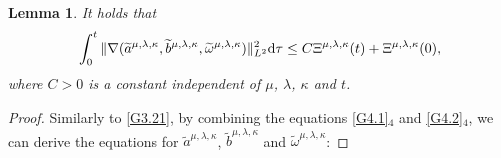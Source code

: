 \documentclass[reqno,11pt]{amsart}
\theoremstyle{plain}
\newtheorem{lem}[thm]{Lemma}
\numberwithin{equation}{section}
\begin{document}
\begin{lem}\label{L4.3}
It holds that
\begin{align}\label{G4.24}
\int_0^t \|\nabla(\widetilde{a}^{\mu,\lambda,\kappa},\widetilde{b}^{\mu,\lambda,\kappa},\widetilde{\omega}^{\mu,\lambda,\kappa}
)\|_{L^2}^2{\rm d}\tau\leq  C {\Xi} ^{\mu,\lambda,\kappa}(t)+{\Xi} ^{\mu,\lambda,\kappa}(0),
\end{align}
where $C>0$ is a constant independent of   $\mu$, $\lambda$, $\kappa$ and   $t$.
\end{lem}
\begin{proof}
Similarly to \eqref{G3.21}, by combining the equations \eqref{G4.1}$_4$ and \eqref{G4.2}$_4$, we can derive the equations for $\widetilde{a}^{\mu,\lambda,\kappa}$, $\widetilde{b}^{\mu,\lambda,\kappa}$ and $\widetilde{\omega}^{\mu,\lambda,\kappa}$:


\end{proof}
\end{document}
